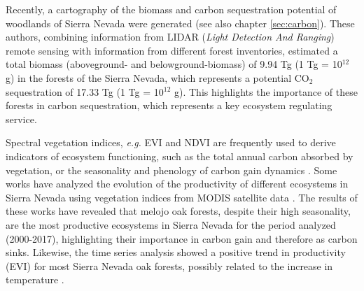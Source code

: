 Recently, a cartography of the biomass and carbon sequestration potential of \Qp woodlands of Sierra Nevada were generated \autocites{PerezLuqueetal2021CarbonSequestration} (see also chapter \ref{sec:carbon}). These authors, combining information from LIDAR (\emph{Light Detection And Ranging}) remote sensing with information from different forest inventories, estimated a total biomass (aboveground- and belowground-biomass) of 9.94 Tg (1 Tg = 10$^12$ g) in the \Qp forests of the Sierra Nevada, which represents a potential CO$_2$ sequestration of 17.33 Tg (1 Tg = 10$^12$ g). This highlights the importance of these forests in carbon sequestration, which represents a key ecosystem regulating service.

Spectral vegetation indices, \emph{e.g.} EVI and NDVI are frequently used to derive indicators of ecosystem functioning, such as the total annual carbon absorbed by vegetation, or the seasonality and phenology of carbon gain dynamics \autocites{Xiaoetal2019RemoteSensing,
AlcarazSeguraetal2009BaselineCharacterization,AlcarazSeguraetal2009UseDescriptors,Cazorlaetal2020RemoteSensingbased}. Some works have analyzed the evolution of the productivity of different ecosystems in Sierra Nevada using vegetation indices from MODIS satellite data \autocites{Dionisioetal2012SatelliteBasedMonitoring,AlcarazSeguraetal2016ChangesVegetation,PerezLuqueetal2015OntologicalSystem,Cazorlaetal2020RemoteSensingbased}. The results of these works have revealed that melojo oak forests, despite their high seasonality, are the most productive ecosystems in Sierra Nevada for the period analyzed (2000-2017), highlighting their importance in carbon gain and therefore as carbon sinks. Likewise, the time series analysis showed a positive trend in productivity (EVI) for most Sierra Nevada oak forests, possibly related to the increase in temperature \autocite{PerezLuqueetal2015OntologicalSystem}.

